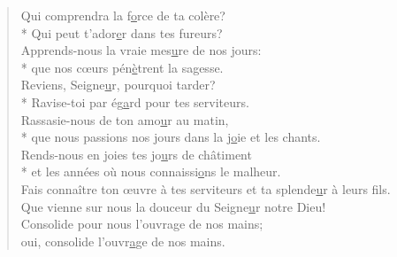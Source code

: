 \begin{verse}
Qui comprendra la f\underline{o}rce de ta colère? \\*
Qui peut t’ador\underline{e}r dans tes fureurs? \\
Apprends-nous la vraie mes\underline{u}re de nos jours: \\*
que nos cœurs pén\underline{è}trent la sagesse. \\

Reviens, Seigne\underline{u}r, pourquoi tarder? \\*
Ravise-toi par ég\underline{a}rd pour tes serviteurs. \\
Rassasie-nous de ton amo\underline{u}r au matin, \\*
que nous passions nos jours dans la j\underline{o}ie et les chants. \\
Rends-nous en joies tes jo\underline{u}rs de châtiment \\*
et les années où nous connaissi\underline{o}ns le malheur. \\

Fais connaître ton œuvre à tes serviteurs
et ta splende\underline{u}r à leurs fils. \\
Que vienne sur nous
la douceur du Seigne\underline{u}r notre Dieu! \\
Consolide pour nous l’ouvrage de nos mains; \\
oui, consolide l’ouvr\underline{a}ge de nos mains. \\
\end{verse}

